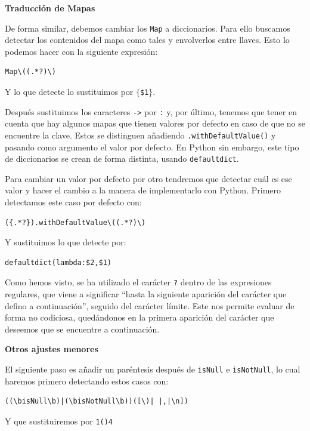\documentclass[12pt,twoside,titlepage]{report}
\newcommand{\quotes}[1]{``#1''}
\begin{document}
\textbf{Traducción de Mapas}

De forma similar, debemos cambiar los \texttt{Map} a diccionarios. Para ello buscamos detectar los contenidos del mapa como tales y envolverlos entre llaves. Esto lo podemos hacer con la siguiente expresión:

\begin{lstlisting}
Map\((.*?)\)
\end{lstlisting}

Y lo que detecte lo sustituimos por \texttt{$\lbrace$\$1$\rbrace$}.

Después sustituimos los caracteres \texttt{->} por \texttt{:} y, por último, tenemos que tener en cuenta que hay algunos mapas que tienen valores por defecto en caso de que no se encuentre la clave. Estos se distinguen añadiendo \texttt{.withDefaultValue()} y pasando como argumento el valor por defecto. En Python sin embargo, este tipo de diccionarios se crean de forma distinta, usando \texttt{defaultdict}.

Para cambiar un valor por defecto por otro tendremos que detectar cuál es ese valor y hacer el cambio a la manera de implementarlo con Python. Primero detectamos este caso por defecto con:

\begin{lstlisting}
({.*?}).withDefaultValue\((.*?)\)
\end{lstlisting}

Y sustituimos lo que detecte por:

\begin{lstlisting}
defaultdict(lambda:$2,$1)
\end{lstlisting}

Como hemos visto, se ha utilizado el carácter \texttt{?} dentro de las expresiones regulares, que viene a significar \quotes{hasta la siguiente aparición del carácter que defino a continuación}, seguido del carácter límite. Este nos permite evaluar de forma no codiciosa, quedándonos en la primera aparición del carácter que deseemos que se encuentre a continuación.


\textbf{Otros ajustes menores}

El siguiente paso es añadir un paréntesis después de \texttt{isNull} e \texttt{isNotNull}, lo cual haremos primero detectando estos casos con:

\begin{lstlisting}
((\bisNull\b)|(\bisNotNull\b))([\)| |,|\n])
\end{lstlisting}

Y que sustituiremos por \texttt{1()4}
\end{document}
